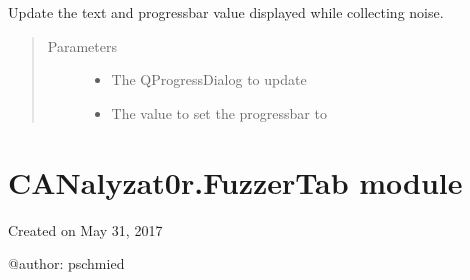 \documentclass[letterpaper,10pt,english]{sphinxmanual}
\begin{document}
\begin{fulllineitems}
\begin{fulllineitems}
\begin{quote}
\begin{description}
\end{description}\end{quote}

\end{fulllineitems}


\begin{fulllineitems}
\label{\detokenize{src:src.FilterTab.FilterTab.updateNoiseCollectProgress}}
Update the text and progressbar value displayed while collecting noise.
\begin{quote}\begin{description}
\item[{Parameters}] \leavevmode\begin{itemize}
\item {} 
 \textendash{} The QProgressDialog to update

\item {} 
 \textendash{} The value to set the progressbar to

\end{itemize}

\end{description}\end{quote}

\end{fulllineitems}


\end{fulllineitems}



\section{CANalyzat0r.FuzzerTab module}
\label{\detokenize{src:module-src.FuzzerTab}}\label{\detokenize{src:canalyzat0r-fuzzertab-module}}
Created on May 31, 2017

@author: pschmied
\end{document}
